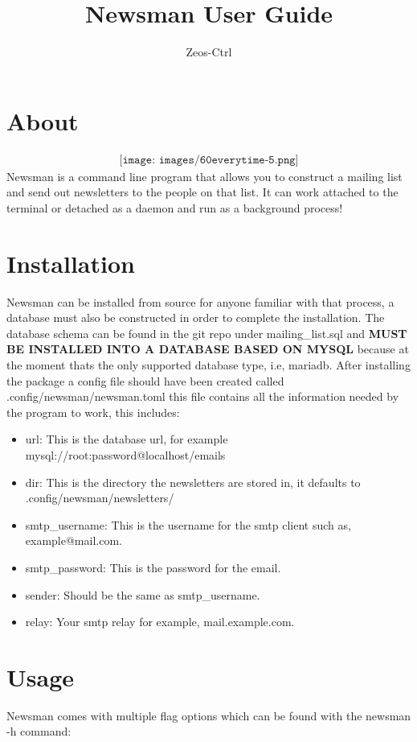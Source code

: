 \documentclass[12pt]{article}
\title{Newsman User Guide}
\author{Zeos-Ctrl}
\begin{document}
\maketitle
\newpage

\tableofcontents

\section{About}
\begin{align*}
    \texttt{[image: images/60everytime-5.png]}
\end{align*}
Newsman is a command line program that allows you to construct a mailing list and send 
out newsletters to the people on that list. It can work attached to the terminal 
or detached as a daemon and run as a background process!

\section{Installation}
Newsman can be installed from source for anyone familiar with that process,
a database must also be constructed in order to complete the installation.
The database schema can be found in the git repo under mailing\_list.sql and 
\textbf{MUST BE INSTALLED INTO A DATABASE BASED ON MYSQL} because at the moment 
thats the only supported database type, i.e, mariadb. After installing 
the package a config file should have been created called 
.config/newsman/newsman.toml this file contains all the information
needed by the program to work, this includes:

\begin{itemize}
    \item url: This is the database url, for example 
        mysql://root:password@localhost/emails 
    \item dir: This is the directory the newsletters are stored in,
        it defaults to .config/newsman/newsletters/
    \item smtp\_username: This is the username for the smtp client such as, 
        example@mail.com.
    \item smtp\_password: This is the password for the email.
    \item sender: Should be the same as smtp\_username.
    \item relay: Your smtp relay for example, mail.example.com.
\end{itemize}

\section{Usage}
Newsman comes with multiple flag options which can be found with the newsman -h 
command:
\end{document}

